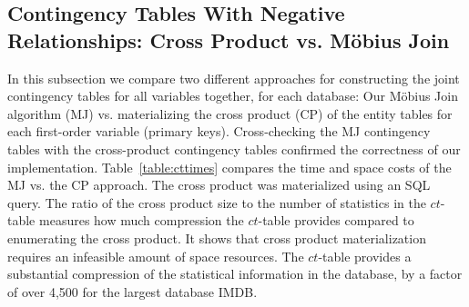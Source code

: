 \documentclass{acm_proc_article-sp}
\newcommand{\ct}{\mathit{ct}}
\begin{document}
\subsection{Contingency Tables With Negative Relationships: Cross Product vs. M\"obius Join}


In this subsection we compare two different approaches for constructing the joint contingency tables for all variables together, for each database: Our M\"obius Join algorithm (MJ) vs. materializing the cross product (CP) of the entity tables for each first-order variable (primary keys).
Cross-checking the MJ contingency tables with the cross-product contingency tables confirmed the correctness of our implementation. Table~\ref{table:cttimes} compares the time and space costs of the MJ vs. the CP approach. The cross product was materialized using an SQL query. 
The ratio of the cross product size to the number of statistics in the $\ct$-table measures how much compression the $\ct$-table provides compared to enumerating the cross product. 
It shows that cross product materialization  requires an infeasible amount of space resources.
The $\ct$-table provides a substantial compression of the statistical information in the database, by a factor of over 4,500 for the largest database IMDB.  

\begin{table}[htbp] \centering
\caption{Constructing the contingency table for each dataset. 
M = million. N.T. = non-termination. Compress Ratio = CP-\#tuples/\#Statistics.
  \label{table:cttimes}}
\end{table}
\end{document}
